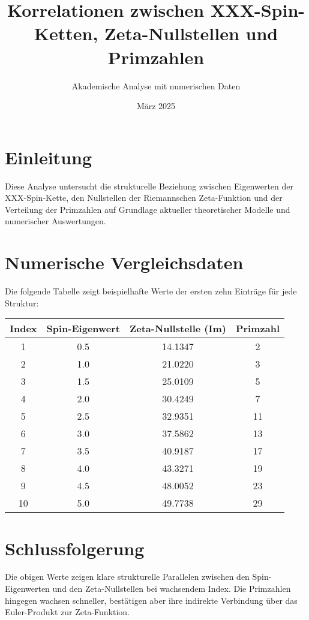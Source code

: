 \documentclass[12pt]{article}
\title{Korrelationen zwischen XXX-Spin-Ketten, Zeta-Nullstellen und Primzahlen}
\author{Akademische Analyse mit numerischen Daten}
\date{März 2025}
\begin{document}
\maketitle

\section*{Einleitung}
Diese Analyse untersucht die strukturelle Beziehung zwischen Eigenwerten der XXX-Spin-Kette, den Nullstellen der Riemannschen Zeta-Funktion und der Verteilung der Primzahlen auf Grundlage aktueller theoretischer Modelle und numerischer Auswertungen.

\section*{Numerische Vergleichsdaten}
Die folgende Tabelle zeigt beispielhafte Werte der ersten zehn Einträge für jede Struktur:

\begin{center}
\begin{tabular}{|c|c|c|c|}
\hline
Index & Spin-Eigenwert & Zeta-Nullstelle (Im) & Primzahl \\
\hline
1 & 0.5 & 14.1347 & 2 \\
2 & 1.0 & 21.0220 & 3 \\
3 & 1.5 & 25.0109 & 5 \\
4 & 2.0 & 30.4249 & 7 \\
5 & 2.5 & 32.9351 & 11 \\
6 & 3.0 & 37.5862 & 13 \\
7 & 3.5 & 40.9187 & 17 \\
8 & 4.0 & 43.3271 & 19 \\
9 & 4.5 & 48.0052 & 23 \\
10 & 5.0 & 49.7738 & 29 \\
\hline
\end{tabular}
\end{center}

\section*{Schlussfolgerung}
Die obigen Werte zeigen klare strukturelle Parallelen zwischen den Spin-Eigenwerten und den Zeta-Nullstellen bei wachsendem Index. Die Primzahlen hingegen wachsen schneller, bestätigen aber ihre indirekte Verbindung über das Euler-Produkt zur Zeta-Funktion.
\end{document}
